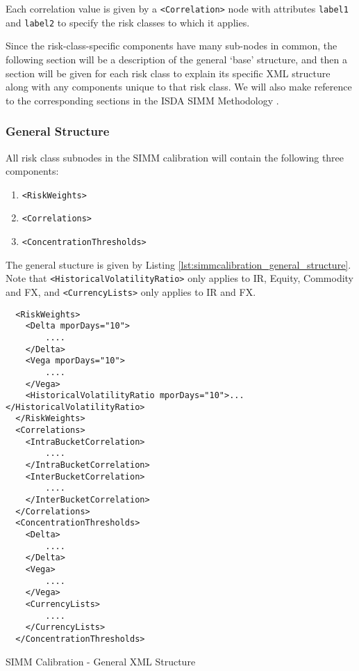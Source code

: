 Each correlation value is given by a {\tt <Correlation>} node with attributes {\tt label1} and {\tt label2} to 
specify the risk classes to which it applies.

Since the risk-class-specific components have many sub-nodes in common, the following section will be a description of the
general `base' structure, and then a section will be given for each risk class to explain its specific XML structure along
with any components unique to that risk class. We will also make reference to the corresponding sections in the ISDA
SIMM Methodology \cite{SIMM2.6}.

\subsubsection{General Structure}

All risk class subnodes in the SIMM calibration will contain the following three components:

\begin{enumerate}
  \item {\tt <RiskWeights>}
  \item {\tt <Correlations>}
  \item {\tt <ConcentrationThresholds>}
\end{enumerate}

The general stucture is given by Listing \ref{lst:simmcalibration_general_structure}. Note that
{\tt <HistoricalVolatilityRatio>} only applies to IR, Equity, Commodity and FX, and
{\tt <CurrencyLists>} only applies to IR and FX.

\begin{listing}[H]
\begin{verbatim}
  <RiskWeights>
    <Delta mporDays="10">
        ....
    </Delta>
    <Vega mporDays="10">
        ....
    </Vega>
    <HistoricalVolatilityRatio mporDays="10">...</HistoricalVolatilityRatio>
  </RiskWeights>
  <Correlations>
    <IntraBucketCorrelation>
        ....
    </IntraBucketCorrelation>
    <InterBucketCorrelation>
        ....
    </InterBucketCorrelation>
  </Correlations>
  <ConcentrationThresholds>
    <Delta>
        ....
    </Delta>
    <Vega>
        ....
    </Vega>
    <CurrencyLists>
        ....
    </CurrencyLists>
  </ConcentrationThresholds>
\end{verbatim}
\caption{SIMM Calibration - General XML Structure}
\label{lst:simmcalibration_general_structure}
\end{listing}

